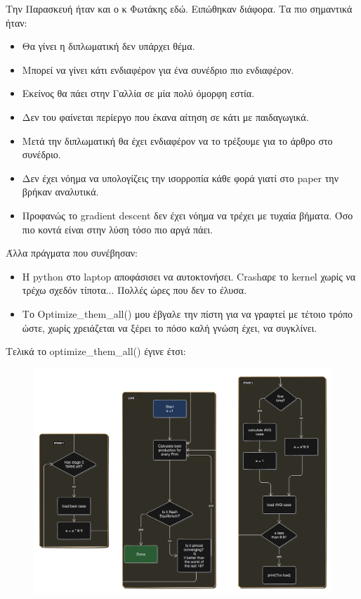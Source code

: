 \documentclass[a4paper,twoside,10pt]{article}
\begin{document}
Την Παρασκευή ήταν και ο κ Φωτάκης εδώ. Ειπώθηκαν διάφορα. Τα πιο σημαντικά ήταν:
\begin{itemize}
	\item Θα γίνει η διπλωματική δεν υπάρχει θέμα.
	\item Μπορεί να γίνει κάτι ενδιαφέρον για ένα συνέδριο πιο ενδιαφέρον. 
	\item Εκείνος θα πάει στην Γαλλία σε μία πολύ όμορφη εστία. 
	\item Δεν του φαίνεται περίεργο που έκανα αίτηση σε κάτι με παιδαγωγικά. 
	\item Μετά την διπλωματική θα έχει ενδιαφέρον να το τρέξουμε για το άρθρο στο συνέδριο.
	\item Δεν έχει νόημα να υπολογίζεις την ισορροπία κάθε φορά γιατί στο paper την βρήκαν αναλυτικά. 
	\item Προφανώς το gradient descent δεν έχει νόημα να τρέχει με τυχαία βήματα. Όσο πιο κοντά είναι στην λύση τόσο πιο αργά πάει. 
\end{itemize}
Άλλα πράγματα που συνέβησαν:
\begin{itemize}
	\item Η python στο laptop αποφάσισει να αυτοκτονήσει. Crashαρε το kernel χωρίς να τρέχω σχεδόν τίποτα... Πολλές ώρες που δεν το έλυσα.
	\item Το Optimize\_them\_all() μου έβγαλε την πίστη για να γραφτεί με τέτοιο τρόπο ώστε, χωρίς χρειάζεται να ξέρει το πόσο καλή γνώση έχει, να συγκλίνει.
\end{itemize}
Τελικά το optimize\_them\_all() έγινε έτσι:


\begin{figure}[H]
	\centering
	\includegraphics[width=0.8\linewidth]{images/diagram-export-9-12-2024-4_31_44-PM}
	\caption{}
	\label{fig:diagram-export-9-12-2024-43144-pm}
\end{figure}
\end{document}

